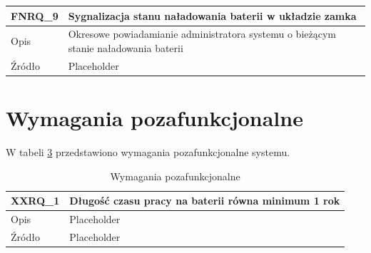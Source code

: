 \begin{table}
\begin{subtable}[c]{\textwidth}
\begin{tabular}{|p{2cm}|p{10cm}|}
                    \hline
                \end{tabular}
                \label{tbl:fnrq8}
                \vspace{10mm}           
            \end{subtable}
        \quad%
            \begin{subtable}[c]{\textwidth}
                \centering
                 \begin{tabular}{|p{2cm}|p{10cm}|}
                    \hline FNRQ\_9      & Sygnalizacja stanu naładowania baterii w układzie zamka  \\
                    \hline Opis         & Okresowe powiadamianie administratora systemu o bieżącym stanie naładowania baterii \\
                    \hline Źródło       & Placeholder    \\
                    \hline
                \end{tabular}
                \label{tbl:fnrq9}
                \vspace{10mm}           
            \end{subtable}
            \label{tbl:fnrq_2}
        \end{table}

        \section{Wymagania pozafunkcjonalne}

            W tabeli \ref{tbl:xxrq} przedstawiono wymagania pozafunkcjonalne systemu.

            \begin{table}
            \caption{Wymagania pozafunkcjonalne}
            \centering
            \begin{subtable}[c]{\textwidth}
                \centering
                \begin{tabular}{|p{2cm}|p{10cm}|}
                    \hline XXRQ\_1      & Długość czasu pracy na baterii równa minimum 1 rok  \\
                    \hline Opis         & Placeholder  \\
                    \hline Źródło       & Placeholder    \\
                    \hline
                \end{tabular}
                \label{tbl:xxrq1}
                \vspace{10mm}           
            \end{subtable}
            \label{tbl:xxrq}
        \end{table}


